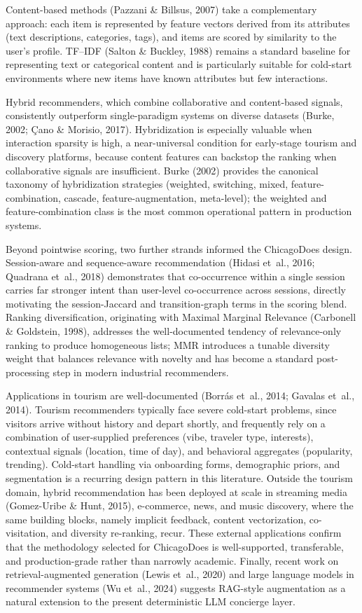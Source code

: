 \documentclass[12pt,letterpaper]{article}
\begin{document}
Content-based methods (Pazzani \& Billsus, 2007) take a complementary
approach: each item is represented by feature vectors derived from its
attributes (text descriptions, categories, tags), and items are scored
by similarity to the user's profile. TF--IDF (Salton \& Buckley, 1988)
remains a standard baseline for representing text or categorical
content and is particularly suitable for cold-start environments where
new items have known attributes but few interactions.

Hybrid recommenders, which combine collaborative and content-based
signals, consistently outperform single-paradigm systems on diverse
datasets (Burke, 2002; \c{C}ano \& Morisio, 2017). Hybridization is
especially valuable when interaction sparsity is high, a
near-universal condition for early-stage tourism and discovery
platforms, because content features can backstop the ranking when
collaborative signals are insufficient. Burke (2002) provides the
canonical taxonomy of hybridization strategies (weighted, switching,
mixed, feature-combination, cascade, feature-augmentation,
meta-level); the weighted and feature-combination class is the most
common operational pattern in production systems.

Beyond pointwise scoring, two further strands informed the ChicagoDoes
design. Session-aware and sequence-aware recommendation (Hidasi
et~al., 2016; Quadrana et~al., 2018) demonstrates that co-occurrence
within a single session carries far stronger intent than user-level
co-occurrence across sessions, directly motivating the session-Jaccard
and transition-graph terms in the scoring blend. Ranking
diversification, originating with Maximal Marginal Relevance
(Carbonell \& Goldstein, 1998), addresses the well-documented tendency
of relevance-only ranking to produce homogeneous lists; MMR introduces
a tunable diversity weight that balances relevance with novelty and
has become a standard post-processing step in modern industrial
recommenders.

Applications in tourism are well-documented (Borr\'{a}s et~al., 2014;
Gavalas et~al., 2014). Tourism recommenders typically face severe
cold-start problems, since visitors arrive without history and depart
shortly, and frequently rely on a combination of user-supplied
preferences (vibe, traveler type, interests), contextual signals
(location, time of day), and behavioral aggregates (popularity,
trending). Cold-start handling via onboarding forms, demographic
priors, and segmentation is a recurring design pattern in this
literature. Outside the tourism domain, hybrid recommendation has been
deployed at scale in streaming media (Gomez-Uribe \& Hunt, 2015),
e-commerce, news, and music discovery, where the same building blocks,
namely implicit feedback, content vectorization, co-visitation, and
diversity re-ranking, recur. These external applications confirm that
the methodology selected for ChicagoDoes is well-supported,
transferable, and production-grade rather than narrowly academic.
Finally, recent work on retrieval-augmented generation (Lewis et~al.,
2020) and large language models in recommender systems (Wu et~al.,
2024) suggests RAG-style augmentation as a natural extension to the
present deterministic LLM concierge layer.
\end{document}
